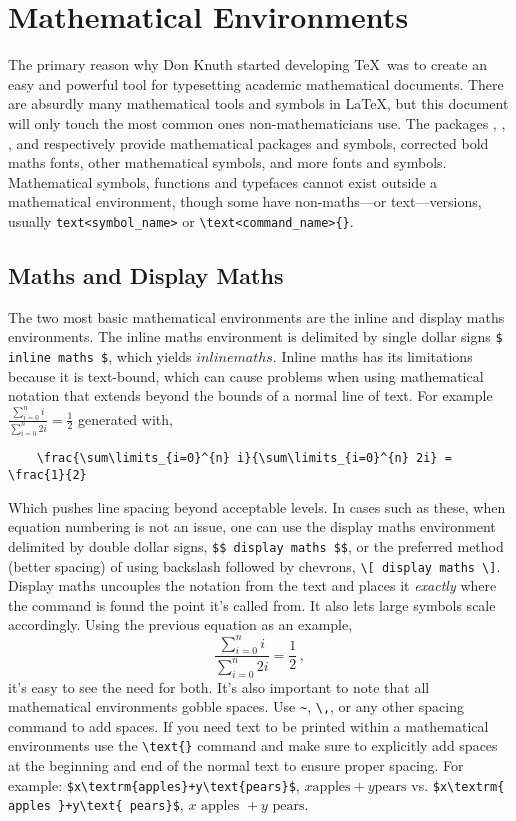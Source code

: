 \chapter{Mathematical Environments}
%
The primary reason why Don Knuth started developing \TeX~was to create
an easy and powerful tool for typesetting academic mathematical
documents.  There are absurdly many mathematical tools and symbols in
\LaTeX, but this document will only touch the most common ones
non-mathematicians use.  The packages , ,
, and  respectively provide mathematical
packages and symbols, corrected bold maths fonts, other mathematical
symbols, and more fonts and symbols.  Mathematical symbols, functions
and typefaces cannot exist outside a mathematical environment, though
some have non-maths---or text---versions, usually
\verb|text<symbol_name>| or \verb|\text<command_name>{}|.
%
\section{Maths and Display Maths}
%
The two most basic mathematical environments are the inline and
display maths environments.  The inline maths environment is delimited
by single dollar signs \verb|$ inline maths $|, which yields
$ inline maths $.  Inline maths has its limitations because it is
text-bound, which can cause problems when using mathematical notation
that extends beyond the bounds of a normal line of text.  For example
$ \frac{\sum\limits_{i=0}^{n} i}{\sum\limits_{i=0}^{n} 2i} =
\frac{1}{2} $ generated with,
\begin{verbatim}
	\frac{\sum\limits_{i=0}^{n} i}{\sum\limits_{i=0}^{n} 2i} = \frac{1}{2}
\end{verbatim}
Which pushes line spacing beyond acceptable levels.  In cases such as
these, when equation numbering is not an issue, one can use the
display maths environment delimited by double dollar signs,
\verb|$$ display maths $$|, or the preferred method (better spacing)
of using backslash followed by chevrons, \verb|\[ display maths \]|.
Display maths uncouples the notation from the text and places it
\emph{exactly} where the command is found the point it's called
from.  It also lets large symbols scale accordingly.  Using the previous
equation as an example,
\[ \frac{\sum\limits_{i=0}^{n} i}{\sum\limits_{i=0}^{n} 2i} =
  \frac{1}{2}\,, \]
it's easy to see the need for both.  It's also important to note that
all mathematical environments gobble spaces.  Use \verb|~|, \verb|\,|,
or any other spacing command to add spaces.  If you need text to be
printed within a mathematical environments use the \verb|\text{}|
command and make sure to explicitly add spaces at the beginning and
end of the normal text to ensure proper spacing.  For example:
\verb|$x\textrm{apples}+y\text{pears}$|,
$x\textrm{apples}+y\text{pears}$ vs.
\verb|$x\textrm{ apples }+y\text{ pears}$|,
$x\textrm{ apples }+y\text{ pears}$.
%
